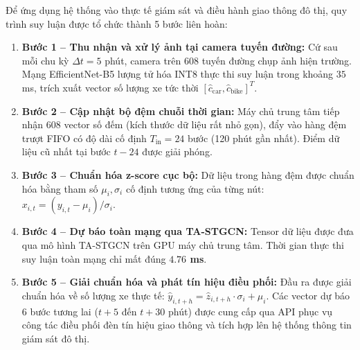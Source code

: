 Để ứng dụng hệ thống vào thực tế giám sát và điều hành giao thông đô thị, quy trình suy luận được tổ chức thành 5 bước liên hoàn:
\begin{enumerate}
    \item \textbf{Bước 1 -- Thu nhận và xử lý ảnh tại camera tuyến đường:} Cứ sau mỗi chu kỳ $\Delta t = 5$ phút, camera trên 608 tuyến đường chụp ảnh hiện trường. Mạng EfficientNet-B5 lượng tử hóa INT8 thực thi suy luận trong khoảng $35$ ms, trích xuất vector số lượng xe tức thời $[\hat{c}_{\text{car}}, \hat{c}_{\text{bike}}]^T$.
    \item \textbf{Bước 2 -- Cập nhật bộ đệm chuỗi thời gian:} Máy chủ trung tâm tiếp nhận 608 vector số đếm (kích thước dữ liệu rất nhỏ gọn), đẩy vào hàng đệm trượt FIFO có độ dài cố định $T_{\text{in}} = 24$ bước (120 phút gần nhất). Điểm dữ liệu cũ nhất tại bước $t-24$ được giải phóng.
    \item \textbf{Bước 3 -- Chuẩn hóa z-score cục bộ:} Dữ liệu trong hàng đệm được chuẩn hóa bằng tham số $\mu_i, \sigma_i$ cố định tương ứng của từng nút: $x_{i, t} = (y_{i, t} - \mu_i) / \sigma_i$.
    \item \textbf{Bước 4 -- Dự báo toàn mạng qua TA-STGCN:} Tensor dữ liệu được đưa qua mô hình TA-STGCN trên GPU máy chủ trung tâm. Thời gian thực thi suy luận toàn mạng chỉ mất đúng \textbf{$4.76$ ms}.
    \item \textbf{Bước 5 -- Giải chuẩn hóa và phát tín hiệu điều phối:} Đầu ra được giải chuẩn hóa về số lượng xe thực tế: $\hat{y}_{i, t+h} = \hat{z}_{i, t+h} \cdot \sigma_i + \mu_i$. Các vector dự báo 6 bước tương lai ($t+5$ đến $t+30$ phút) được cung cấp qua API phục vụ công tác điều phối đèn tín hiệu giao thông và tích hợp lên hệ thống thông tin giám sát đô thị.
\end{enumerate}

